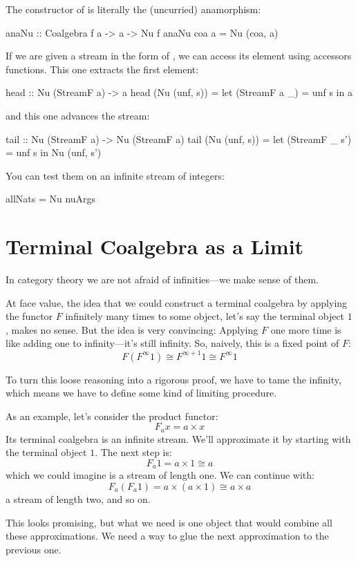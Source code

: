 \documentclass[DaoFP]{subfiles}
\begin{document}
The constructor of  is literally the (uncurried) anamorphism:
\begin{haskell}
anaNu :: Coalgebra f a -> a -> Nu f
anaNu coa a = Nu (coa, a)
\end{haskell}

If we are given a stream in the form of , we can access its element using accessors functions. This one extracts the first element:
\begin{haskell}
head :: Nu (StreamF a) -> a
head (Nu (unf, s)) = 
  let (StreamF a _) = unf s 
  in a
\end{haskell}
and this one advances the stream:
\begin{haskell}
tail :: Nu (StreamF a) -> Nu (StreamF a)
tail (Nu (unf, s)) = 
  let (StreamF _ s') = unf s 
  in Nu (unf, s')
\end{haskell}
You can test them on an infinite stream of integers:
\begin{haskell}
allNats = Nu nuArgs
\end{haskell}

\section{Terminal Coalgebra as a Limit}

In category theory we are not afraid of infinities---we make sense of them. 

At face value, the idea that we could construct a terminal coalgebra by applying the functor $F$ infinitely many times to some object, let's say the terminal object $1$, makes no sense. But the idea is very convincing: Applying $F$ one more time is like adding one to infinity---it's still infinity. So, naively, this is a fixed point of $F$:
\[ F (F^{\infty} 1) \cong F^{\infty + 1} 1 \cong F^{\infty} 1\]

To turn this loose reasoning into a rigorous proof, we have to tame the infinity, which means we have to define some kind of limiting procedure. 

As an example, let's consider the product functor:
\[F_a x = a \times x \]
Its terminal coalgebra is an infinite stream. We'll approximate it by starting with the terminal object $1$. The next step is:
\[ F_a 1 = a \times 1 \cong a \]
which we could imagine is a stream of length one. We can continue with:
\[ F_a (F_a 1) = a \times (a \times 1) \cong a \times a \]
a stream of length two, and so on. 

This looks promising, but what we need is one object that would combine all these approximations. We need a way to glue the next approximation to the previous one.
\end{document}
